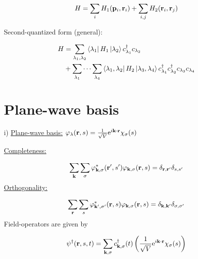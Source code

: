 \begin{equation}
	H= \sum_i H_1(\vb{p}_i, \vb{r}_i) + \sum_{i,j} H_2 (\vb{r}_i, \vb{r}_j )
\end{equation}

\begin{tcolorbox}
	\noindent Second-quantized form (general):
	
	\begin{align}
		H & = \sum_{\lambda_{1}, \lambda_{2}} \bra{\lambda_{1}} H_1 \ket{\lambda_{2}} c^{\dagger}_{\lambda_1} c_{\lambda_2} \nonumber \\
		&+ \sum_{\lambda_{1}} \cdots \sum_{\lambda_{4}} \bra{\lambda_{1}, \lambda_{2}} H_2 \ket{\lambda_{3}, \lambda_{4}} c^{\dagger}_{\lambda_1} c^{\dagger}_{\lambda_2} c_{\lambda_{3}} c_{\lambda_{4}}
	\end{align}
\end{tcolorbox}

\section{Plane-wave basis}
\noindent i) \uline{Plane-wave basis:}  ${\varphi_{\lambda} (\vb{r},s) = \frac{1}{\sqrt{V}} \mathrm{e}^{i \vb{k}\cdot \vb{r}} \chi_\sigma (s)  }$ \\
\linebreak

\noindent \uline{Completeness:}

\begin{equation}
	\sum_{\vb{k}} \sum_{\sigma} \varphi_{\vb{k}, \sigma}^* (\vb{r}', s') \varphi_{\vb{k}, \sigma} (\vb{r}, s) = \delta_{\vb{r}, \vb{r}'} \delta_{s,s'}
\end{equation}
\linebreak
\noindent \uline{Orthogonality:}

\begin{equation}
	\sum_{\vb{r}} \sum_{s} \varphi_{\vb{k}', \sigma'}^* (\vb{r}, s) \varphi_{\vb{k}, \sigma} (\vb{r}, s) = \delta_{\vb{k}, \vb{k}'} \delta_{\sigma,\sigma'}
\end{equation}
\linebreak
\noindent Field-operators are given by

\begin{equation}
	\psi^\dagger (\vb{r},s,t) = \sum_{\vb{k}, \sigma} c^{\dagger}_{\vb{k}, \sigma} (t) \left( \frac{1}{\sqrt{V}} \mathrm{e}^{i \vb{k} \cdot \vb{r}} \chi_\sigma (s) \right)
\end{equation}

